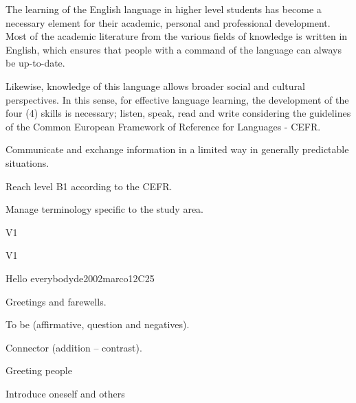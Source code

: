 \begin{syllabus}


\begin{justification}
The learning of the English language in higher level students has become a necessary 
element for their academic, personal and professional development.
Most of the academic literature from the various fields of knowledge is written in English, 
which ensures that people with a command of the language can always be up-to-date.

Likewise, knowledge of this language allows broader social and cultural perspectives. 
In this sense, for effective language learning, the development of the four (4) 
skills is necessary; listen, speak, read and write considering the guidelines of the 
Common European Framework of Reference for Languages - CEFR.
\end{justification}

\begin{goals}
\item Communicate and exchange information in a limited way in generally predictable situations.
\item Reach level B1 according to the CEFR.
\item Manage terminology specific to the study area.
\end{goals}

\begin{outcomes}{V1}
\item {}
\end{outcomes}

\begin{competences}{V1}
    \item {}
\end{competences}

\begin{unit}{Hello everybody}{}{de2002marco}{12}{C25}
   \begin{topics}
      \item Greetings and farewells.
      \item To be (affirmative, question and negatives).
      \item Connector (addition – contrast).
   \end{topics}

   \begin{learningoutcomes}
      \item Greeting people
      \item Introduce oneself and others
   \end{learningoutcomes}
\end{unit}


\end{syllabus}
